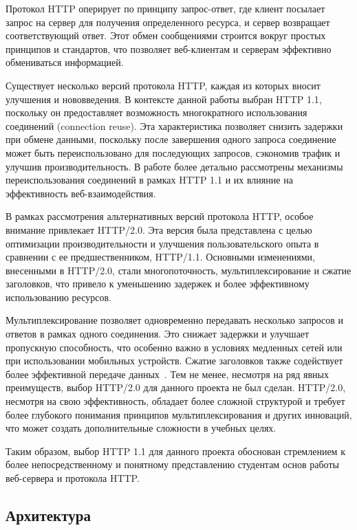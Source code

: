 Протокол HTTP оперирует по принципу запрос-ответ, где клиент посылает запрос на сервер для получения определенного ресурса, и сервер возвращает соответствующий ответ. 
Этот обмен сообщениями строится вокруг простых принципов и стандартов, что позволяет веб-клиентам и серверам эффективно
обмениваться информацией.

Существует несколько версий протокола HTTP, каждая из которых вносит улучшения и нововведения. 
В контексте данной работы выбран HTTP 1.1, поскольку он предоставляет возможность многократного использования соединений (connection reuse). 
Эта характеристика позволяет снизить задержки при обмене данными, поскольку после завершения одного запроса соединение может быть переиспользовано для последующих запросов, сэкономив трафик и улучшив производительность. 
В работе более детально рассмотрены механизмы переиспользования соединений в рамках HTTP 1.1 и их влияние на эффективность веб-взаимодействия.

В рамках рассмотрения альтернативных версий протокола HTTP, особое внимание привлекает HTTP/2.0. 
Эта версия была представлена с целью оптимизации производительности и улучшения пользовательского опыта в сравнении с ее предшественником, HTTP/1.1. 
Основными изменениями, внесенными в HTTP/2.0, стали многопоточность, мультиплексирование и сжатие заголовков, что привело к уменьшению задержек и более эффективному использованию ресурсов.

Мультиплексирование позволяет одновременно передавать несколько запросов и ответов в рамках одного соединения. 
Это снижает задержки и улучшает пропускную способность, что особенно важно в условиях медленных сетей или при использовании мобильных устройств. 
Сжатие заголовков также содействует более эффективной передаче данных~\cite{tan}. 
Тем не менее, несмотря на ряд явных преимуществ, выбор HTTP/2.0 для данного проекта не был сделан. 
HTTP/2.0, несмотря на свою эффективность, обладает более сложной структурой и требует более глубокого понимания принципов мультиплексирования и других инноваций, что может создать дополнительные сложности в учебных целях.

Таким образом, выбор HTTP 1.1 для данного проекта обоснован стремлением к более непосредственному и понятному представлению студентам основ работы веб-сервера и протокола HTTP.

\subsection{Архитектура}

